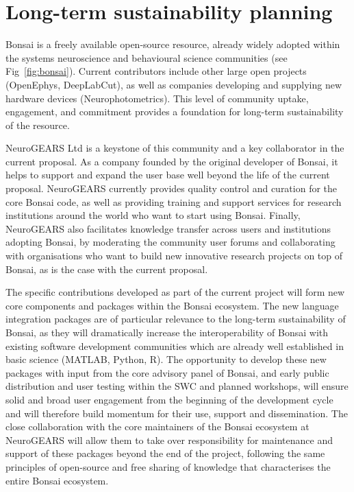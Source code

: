 

\section{Long-term sustainability planning}

Bonsai is a freely available open-source resource, already widely adopted within
the systems neuroscience and behavioural science communities (see Fig~\ref{fig:bonsai}).  
%
Current contributors include other large open projects (OpenEphys, DeepLabCut),
as well as companies developing and supplying new hardware devices  (Neurophotometrics).
%
This level of community uptake, engagement, and commitment provides a foundation for
long-term sustainability of the resource.

NeuroGEARS Ltd is a keystone of this community and a key collaborator in the current proposal.
As a company founded by the original developer of Bonsai, it helps to support and expand the
user base well beyond the life of the current proposal. NeuroGEARS currently provides
quality control and curation for the core Bonsai code, as well as providing training and support
services for research institutions around the world who want to start using Bonsai.
Finally, NeuroGEARS also facilitates knowledge transfer across users and institutions adopting
Bonsai, by moderating the community user forums and collaborating with organisations
who want to build new innovative research projects on top of Bonsai, as is the case with the
current proposal.

The specific contributions developed as part of the current project will form new core
components and packages within the Bonsai ecosystem. The new language integration packages are
of particular relevance to the long-term sustainability of Bonsai, as they will dramatically
increase the interoperability of Bonsai with existing software development communities which are
already well established in basic science (MATLAB, Python, R).
%
The opportunity to develop these new packages with input from the core advisory panel of Bonsai,
and early public distribution and user testing within the SWC and planned workshops, will ensure
solid and broad user engagement from the beginning of the development cycle and will therefore
build momentum for their use, support and dissemination.
%
The close collaboration with the core maintainers of the Bonsai ecosystem at NeuroGEARS will
allow them to take over responsibility for maintenance and support of these packages beyond the
end of the project, following the same principles of open-source and free sharing of knowledge
that characterises the entire Bonsai ecosystem.

